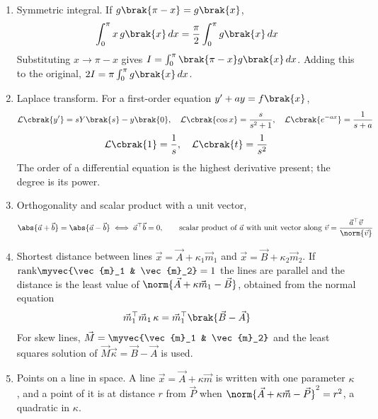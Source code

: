 \begin{enumerate}[label=\thesubsection.\arabic*, ref=\thesubsection.\theenumi]
\item Symmetric integral. If $g\brak{\pi - x} = g\brak{x}$,
\begin{align}
	\int_0^\pi x\,g\brak{x}\,dx = \frac{\pi}{2}\int_0^\pi g\brak{x}\,dx \label{eq:CBSE12-king}
\end{align}
\solution
Substituting $x \to \pi - x$ gives $I = \int_0^\pi\brak{\pi - x}g\brak{x}\,dx$. Adding this to the original, $2I = \pi\int_0^\pi g\brak{x}\,dx$.
\item Laplace transform. For a first-order equation $y^{\prime} + ay = f\brak{x}$,
\begin{align}
	\mathcal{L}\cbrak{y^{\prime}} = sY\brak{s} - y\brak{0}, \quad \mathcal{L}\cbrak{\cos x} = \frac{s}{s^2+1}, \quad \mathcal{L}\cbrak{e^{-ax}} = \frac{1}{s+a} \label{eq:CBSE12-laplace}
\end{align}
\begin{align}
	\mathcal{L}\cbrak{1} = \frac{1}{s}, \quad \mathcal{L}\cbrak{t} = \frac{1}{s^2} \label{eq:CBSE12-laplace2}
\end{align}
The order of a differential equation is the highest derivative present; the degree is its power. 
\item Orthogonality and scalar product with a unit vector,
\begin{align}
	\abs{\vec{a}+\vec{b}} = \abs{\vec{a}-\vec{b}} \iff \vec{a}^{\top}\vec{b} = 0, \qquad
	\text{scalar product of } \vec{a} \text{ with unit vector along } \vec{v} = \frac{\vec{a}^{\top}\vec{v}}{\norm{\vec{v}}} \label{eq:CBSE12-vec}
\end{align}
\item Shortest distance between lines $\vec{x} = \vec{A} + \kappa_1\vec{m}_1$ and $\vec{x} = \vec{B} + \kappa_2\vec{m}_2$. If $\text{rank}\myvec{\vec{m}_1 & \vec{m}_2} = 1$ the lines are parallel and the distance is the least value of $\norm{\vec{A} + \kappa\vec{m}_1 - \vec{B}}$, obtained from the normal equation
\begin{align}
	\vec{m}_1^{\top}\vec{m}_1\,\kappa = \vec{m}_1^{\top}\brak{\vec{B}-\vec{A}} \label{eq:CBSE12-pardist}
\end{align}
For skew lines, $\vec{M} = \myvec{\vec{m}_1 & \vec{m}_2}$ and the least squares solution of $\vec{M}\vec{\kappa} = \vec{B} - \vec{A}$ is used.
\item Points on a line in space. A line $\vec{x} = \vec{A} + \kappa\vec{m}$ is written with one parameter $\kappa$, and a point of it is at distance $r$ from $\vec{P}$ when $\norm{\vec{A} + \kappa\vec{m} - \vec{P}}^2 = r^2$, a quadratic in $\kappa$.

\end{enumerate}
